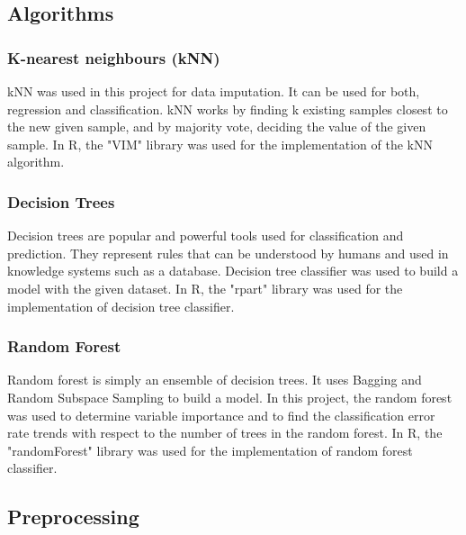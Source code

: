 \documentclass[a4paper]{article}
\begin{document}
\textcolor{titleBlue}{\subsection{Algorithms}}
\textcolor{titleBlue}{\subsubsection{K-nearest neighbours (kNN)}}
kNN was used in this project for data imputation. It can be used for both, regression and classification. kNN works by finding k existing samples closest to the new given sample, and by majority vote, deciding the value of the given sample.
In R, the "VIM" library was used for the implementation of the kNN algorithm.\\
\textcolor{titleBlue}{\subsubsection{Decision Trees}}
Decision trees are popular and powerful tools used for classification and prediction. They represent rules that can be understood by humans and used in knowledge systems such as a database. Decision tree classifier was used to build a model with the given dataset. 
In R, the "rpart" library was used for the implementation of decision tree classifier.\\
\textcolor{titleBlue}{\subsubsection{Random Forest}}
Random forest is simply an ensemble of decision trees. It uses Bagging and Random Subspace Sampling to build a model. In this project, the random forest was used to determine variable importance and to find the classification error rate trends with respect to the number of trees in the random forest. 
In R, the "randomForest" library was used for the implementation of random forest classifier.
\clearpage
\textcolor{titleBlue}{\subsection{Preprocessing}}
\end{document}
